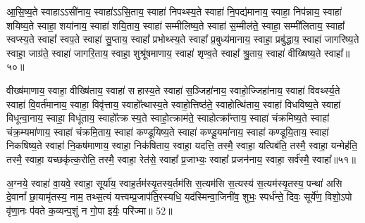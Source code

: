 आ॒सि॒ष्य॒ते स्वाहा\-ऽ\-ऽसी॑नाय॒ स्वाहा॑\-ऽ\-ऽसि॒ताय॒ स्वाहा॑ निपथ्स्य॒ते स्वाहा॑ नि॒पद्य॑मानाय॒ स्वाहा॒ निप॑न्नाय॒ स्वाहा॑ शयिष्य॒ते स्वाहा॒ शया॑नाय॒ स्वाहा॑ शयि॒ताय॒ स्वाहा॑ सम्मीलिष्य॒ते स्वाहा॑ स॒म्मील॑ते॒ स्वाहा॒ सम्मी॑लिताय॒ स्वाहा᳚ स्वप्स्य॒ते स्वाहा᳚ स्वप॒ते स्वाहा॑ सु॒प्ताय॒ स्वाहा᳚ प्रभोथ्स्य॒ते स्वाहा᳚ प्र॒बुध्य॑मानाय॒ स्वाहा॒ प्रबु॑द्धाय॒ स्वाहा॑ जागरिष्य॒ते स्वाहा॒ जाग्र॑ते॒ स्वाहा॑ जागरि॒ताय॒ स्वाहा॒ शुश्रू॑षमाणाय॒ स्वाहा॑ शृण्व॒ते स्वाहा᳚ श्रु॒ताय॒ स्वाहा॑ वीख्षिष्य॒ते स्वाहा᳚॥५०॥

वीख्ष॑माणाय॒ स्वाहा॒ वीख्षि॑ताय॒ स्वाहा॑ सहास्य॒ते स्वाहा॑ स॒ञ्जिहा॑नाय॒ स्वाहो॒ज्जिहा॑नाय॒ स्वाहा॑ विवर्थ्स्य॒ते स्वाहा॑ वि॒वर्त॑मानाय॒ स्वाहा॒ विवृ॑त्ताय॒ स्वाहो᳚त्थास्य॒ते स्वाहो॒त्तिष्ठ॑ते॒ स्वाहोत्थि॑ताय॒ स्वाहा॑ विधविष्य॒ते स्वाहा॑ विधून्वा॒नाय॒ स्वाहा॒ विधू॑ताय॒ स्वाहो᳚त्क्रस्य॒ते स्वाहो॒त्क्राम॑ते॒ स्वाहोत्क्रा᳚न्ताय॒ स्वाहा॑ चंक्रमिष्य॒ते स्वाहा॑ चंक्र॒म्यमा॑णाय॒ स्वाहा॑ चंक्रमि॒ताय॒ स्वाहा॑ कण्डूयिष्य॒ते स्वाहा॑ कण्डू॒यमा॑नाय॒ स्वाहा॑ कण्डूयि॒ताय॒ स्वाहा॑ निकषिष्य॒ते स्वाहा॑ नि॒कष॑माणाय॒ स्वाहा॒ निक॑षिताय॒ स्वाहा॒ यदत्ति॒ तस्मै॒ स्वाहा॒ यत्पिब॑ति॒ तस्मै॒ स्वाहा॒ यन्मेह॑ति॒ तस्मै॒ स्वाहा॒ यच्छकृ॑त्क॒रोति॒ तस्मै॒ स्वाहा॒ रेत॑से॒ स्वाहा᳚ प्र॒जाभ्यः॒ स्वाहा᳚ प्रजन॑नाय॒ स्वाहा॒ सर्व॑स्मै॒ स्वाहा᳚॥५१॥

{\anuvakamend[{}]}

अ॒ग्नये॒ स्वाहा॑ वा॒यवे॒ स्वाहा॒ सूर्या॑य॒ स्वाह॒र्तम॑स्यृ॒तस्य॒र्तम॑सि स॒त्यम॑सि स॒त्यस्य॑ स॒त्यम॑स्यृ॒तस्य॒ पन्था॑ असि दे॒वानां᳚ छा॒यामृ॑तस्य॒ नाम॒ तथ्स॒त्यं यत्त्वम्प्र॒जाप॑ति॒रस्यधि॒ यद॑स्मिन्वा॒जिनी॑व॒ शुभः॒ स्पर्ध॑न्ते॒ दिवः॒ सूर्ये॑ण॒ विशो॒\-ऽपो वृ॑णा॒नः प॑वते क॒व्यन्प॒शुं न गो॒पा इर्यः॒ परि॑ज्मा॥ 52॥


{\anuvakamend[{}]}

{\anuvakamend[{Wrtः ःs᳚rpton ॑out Pr॒sn॒}]}

